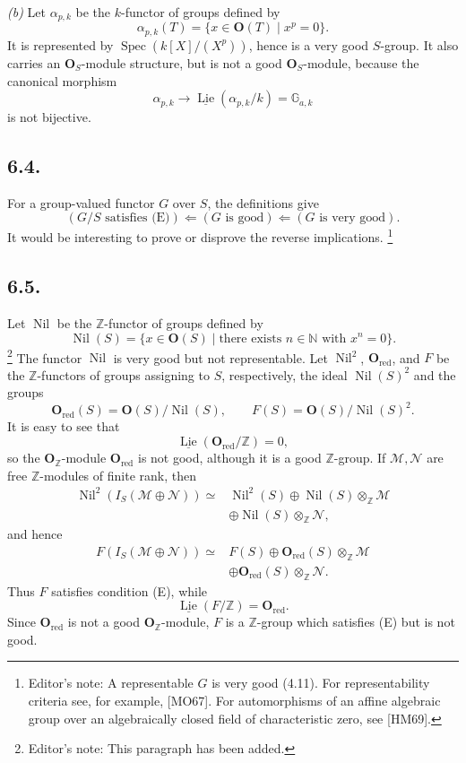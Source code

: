 \medskip
\noindent\textit{(b)}
Let \(\alpha_{p,k}\) be the \(k\)-functor of groups defined by
\[
 \alpha_{p,k}(T)=\{x\in\mathbf O(T)\mid x^p=0\}.
\]
It is represented by
\(\operatorname{Spec}(k[X]/(X^p))\), hence is a very good \(S\)-group.
It also carries an \(\mathbf O_S\)-module structure, but is not a good
\(\mathbf O_S\)-module, because the canonical morphism
\[
 \alpha_{p,k}\longrightarrow
 \underline{\operatorname{Lie}}(\alpha_{p,k}/k)=\mathbb G_{a,k}
\]
is not bijective.

\subsection*{6.4.}
For a group-valued functor \(G\) over \(S\), the definitions give
\[
 (G/S\text{ satisfies (E)})
 \Longleftarrow(G\text{ is good})
 \Longleftarrow(G\text{ is very good}).
\]
It would be interesting to prove or disprove the reverse implications.
\footnote{Editor's note: A representable \(G\) is very good (4.11).
For representability criteria see, for example, [MO67]. For
automorphisms of an affine algebraic group over an algebraically closed
field of characteristic zero, see [HM69].}

\subsection*{6.5.}
Let \(\operatorname{Nil}\) be the \(\mathbb Z\)-functor of groups
defined by
\[
 \operatorname{Nil}(S)
 =\{x\in\mathbf O(S)\mid
       \text{there exists }n\in\mathbb N\text{ with }x^n=0\}.
\]
\footnote{Editor's note: This paragraph has been added.}
The functor \(\operatorname{Nil}\) is very good but not representable.
Let \(\operatorname{Nil}^2\), \(\mathbf O_{\mathrm{red}}\), and \(F\)
be the \(\mathbb Z\)-functors of groups assigning to \(S\),
respectively, the ideal \(\operatorname{Nil}(S)^2\) and the groups
\[
 \mathbf O_{\mathrm{red}}(S)
   =\mathbf O(S)/\operatorname{Nil}(S),
 \qquad
 F(S)=\mathbf O(S)/\operatorname{Nil}(S)^2.
\]
It is easy to see that
\[
 \underline{\operatorname{Lie}}
   (\mathbf O_{\mathrm{red}}/\mathbb Z)=0,
\]
so the \(\mathbf O_{\mathbb Z}\)-module
\(\mathbf O_{\mathrm{red}}\) is not good, although it is a good
\(\mathbb Z\)-group. If \(\mathscr M,\mathscr N\) are free
\(\mathbb Z\)-modules of finite rank, then
\[
\begin{split}
 \operatorname{Nil}^2(I_S(\mathscr M\oplus\mathscr N))
 \simeq{}&
 \operatorname{Nil}^2(S)
 \oplus\operatorname{Nil}(S)\otimes_{\mathbb Z}\mathscr M\\
 &\oplus\operatorname{Nil}(S)\otimes_{\mathbb Z}\mathscr N,
\end{split}
\]
and hence
\[
\begin{split}
 F(I_S(\mathscr M\oplus\mathscr N))
 \simeq{}&F(S)
 \oplus\mathbf O_{\mathrm{red}}(S)\otimes_{\mathbb Z}\mathscr M\\
 &\oplus\mathbf O_{\mathrm{red}}(S)\otimes_{\mathbb Z}\mathscr N.
\end{split}
\]
Thus \(F\) satisfies condition (E), while
\[
 \underline{\operatorname{Lie}}(F/\mathbb Z)
   =\mathbf O_{\mathrm{red}}.
\]
Since \(\mathbf O_{\mathrm{red}}\) is not a good
\(\mathbf O_{\mathbb Z}\)-module, \(F\) is a \(\mathbb Z\)-group
which satisfies (E) but is not good.

